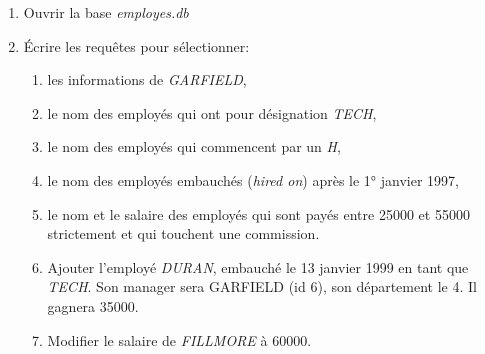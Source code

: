 \documentclass[a4paper,11pt]{article}
\begin{document}
\begin{exo}
\begin{enumerate}
\item Ouvrir la base \emph{employes.db}
\item Écrire les requêtes pour sélectionner:
\begin{enumerate}
\item les informations de \emph{GARFIELD},
\item le nom des employés qui ont pour désignation \emph{TECH},
\item le nom des employés qui commencent par un \emph{H},
\item le nom des employés embauchés (\emph{hired on}) après le 1° janvier 1997,
\item le nom et le salaire des employés qui sont payés entre 25000 et 55000 strictement et qui touchent une commission.
\item Ajouter l'employé \emph{DURAN}, embauché le 13 janvier 1999 en tant que \emph{TECH}. Son manager sera GARFIELD (id 6), son département le 4. Il gagnera 35000.
\item Modifier le salaire de \emph{FILLMORE} à 60000.
\end{enumerate} 
\end{enumerate}
\end{exo}
\end{document}
